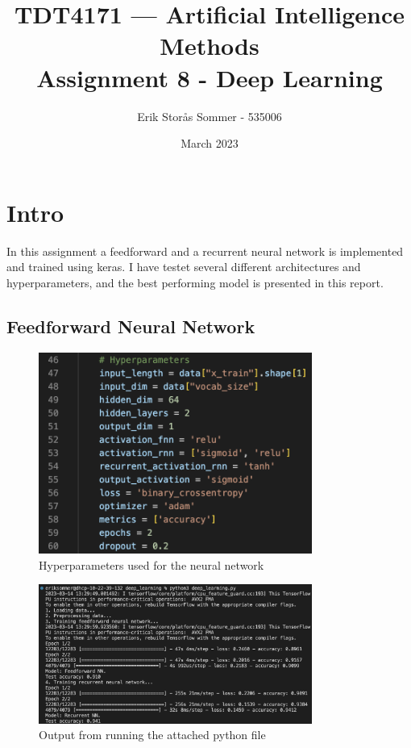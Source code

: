 \documentclass{article}
\title{TDT4171 — Artificial Intelligence Methods \\ Assignment 8 - Deep Learning}
\author{Erik Storås Sommer - 535006}
\date{March 2023}
\begin{document}
\maketitle
\setlength{\parindent}{0pt}

\section*{Intro}

In this assignment a feedforward and a recurrent neural network is implemented and trained using keras. 
I have testet several different architectures and hyperparameters, and the best performing model is presented in this report.

\subsection*{Feedforward Neural Network}

\begin{figure}[hbtp]
    \centering
    \includegraphics[width=0.8\textwidth]{hyperparameters.png}
    \caption{Hyperparameters used for the neural network}
    \label{fig:image1}
\end{figure}


\begin{figure}[hbtp]
    \centering
    \includegraphics[width=0.8\textwidth]{output.png}
    \caption{Output from running the attached python file}
    \label{fig:image2}
\end{figure}
\end{document}
